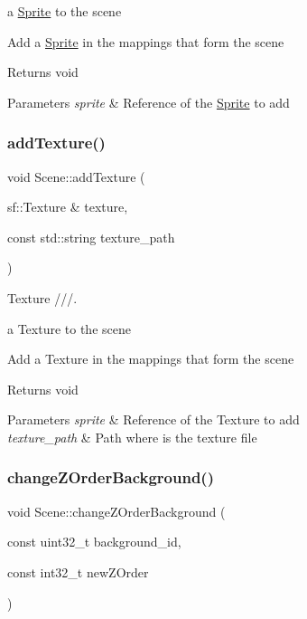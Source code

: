 a \hyperlink{class_sprite}{Sprite} to the scene

Add a \hyperlink{class_sprite}{Sprite} in the mappings that form the scene

\begin{DoxyReturn}{Returns}
void 
\end{DoxyReturn}

\begin{DoxyParams}{Parameters}
{\em sprite} & Reference of the \hyperlink{class_sprite}{Sprite} to add \\
\hline
\end{DoxyParams}
\mbox{\label{class_scene_ad7c686656e9ad8e20f85f7997c4bc747}} 
\subsubsection{\texorpdfstring{add\+Texture()}{addTexture()}}
{\footnotesize\ttfamily void Scene\+::add\+Texture (\begin{DoxyParamCaption}\item[{sf\+::\+Texture \&}]{texture,  }\item[{const std\+::string}]{texture\+\_\+path }\end{DoxyParamCaption})}



Texture ///. 

a Texture to the scene

Add a Texture in the mappings that form the scene

\begin{DoxyReturn}{Returns}
void 
\end{DoxyReturn}

\begin{DoxyParams}{Parameters}
{\em sprite} & Reference of the Texture to add \\
\hline
{\em texture\+\_\+path} & Path where is the texture file \\
\hline
\end{DoxyParams}
\mbox{\label{class_scene_a95b1dd31805e0734f66fb9f131166fa4}} 
\subsubsection{\texorpdfstring{change\+Z\+Order\+Background()}{changeZOrderBackground()}}
{\footnotesize\ttfamily void Scene\+::change\+Z\+Order\+Background (\begin{DoxyParamCaption}\item[{const uint32\+\_\+t}]{background\+\_\+id,  }\item[{const int32\+\_\+t}]{new\+Z\+Order }\end{DoxyParamCaption})}

